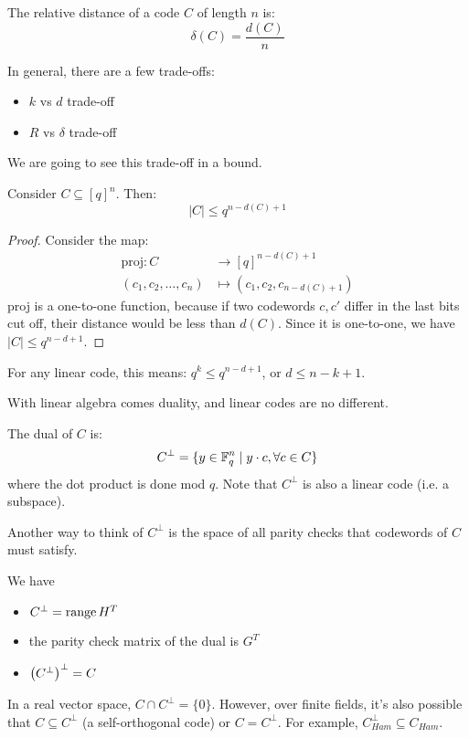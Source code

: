 \begin{definition}
    The relative distance of a code $C$ of length $n$ is:
    \[ \delta(C) = \frac{d(C)}{n} \]
\end{definition}
In general, there are a few trade-offs:
\begin{itemize}
    \item $k$ vs $d$ trade-off
    \item $R$ vs $\delta$ trade-off
\end{itemize}

We are going to see this trade-off in a bound.
\begin{theorem}
    Consider $C \subseteq [q]^n$. Then:
    \[ |C| \leq q^{n - d(C) + 1} \]

    \begin{proof}
        Consider the map:
        \begin{align*}
            \text{proj}: C &\to [q]^{n - d(C) + 1} \\
            (c_1, c_2, \dots, c_n) &\mapsto (c_1, c_2, c_{n - d(C) + 1})
        \end{align*}
        proj is a one-to-one function, because if two codewords $c, c'$ differ in the last bits cut off, their distance would be less than
        $d(C)$. Since it is one-to-one, we have $|C| \leq q^{n - d + 1}$.
    \end{proof}
\end{theorem}
For any linear code, this means: $q^{k} \leq q^{n - d + 1}$, or
$d \leq n - k + 1$.

With linear algebra comes duality, and linear codes are no different.
\begin{definition}
    The dual of $C$ is:
    \[ C^{\perp} = \{y \in \operatorname{\mathbb{F}}_q^n \mid y \cdot c, \forall c \in C\} \]
    where the dot product is done mod $q$. Note that $C^{\perp}$ is also a linear code (i.e. a subspace).
\end{definition}

Another way to think of $C^{\perp}$ is the space of all parity checks that codewords of $C$ must satisfy.

\begin{note}
    We have
    \begin{itemize}
        \item $C^{\perp} = \operatorname{range}{H^T}$
        \item the parity check matrix of the dual is $G^T$
        \item $\qty(C^{\perp})^{\perp} = C$
    \end{itemize}

    In a real vector space, $C \cap C^{\perp} = \{0\}$.
    However, over finite fields, it's also possible that $C \subseteq C^{\perp}$ (a self-orthogonal code) or $C = C^{\perp}$.
    For example, $C_{Ham}^{\perp} \subseteq C_{Ham}$.
\end{note}

